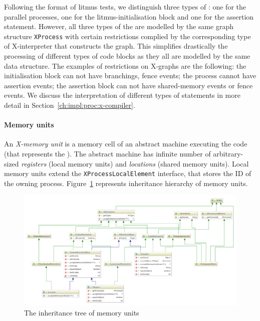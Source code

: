 Following the format of litmus tests, we distinguish three types of \xgraph{}: one for the parallel processes, one for the litmus-initialisation block and one for the assertion statement.
However, all three types of the \xgraph{} are modelled by the same graph structure \texttt{XProcess} with certain restrictions complied by the corresponding type of X-interpreter that constructs the graph.
This simplifies drastically the processing of different types of code blocks as they all are modelled by the same data structure.
The examples of restrictions on X-graphs are the following: the initialisation block can not have branchings, fence events; the process cannot have assertion events; the assertion block can not have shared-memory events or fence events.
We discuss the interpretation of different types of statements in more detail in Section~\ref{ch:impl:proc:x-compiler}.


\paragraph{Memory units}

An \textit{X-memory unit} is a memory cell of an abstract machine executing the code (that represents the \xgraph{}).
The abstract machine has infinite number of arbitrary-sized \textit{registers} (local memory units) and \textit{locations} (shared memory units).
Local memory units extend the \texttt{XProcessLocalElement} interface, that stores the ID of the owning process.
Figure~\ref{fig:class-diagrams:XMemoryUnit} represents inheritance hierarchy of memory units.

\begin{figure}[t]%
  \centering
  \includegraphics[width=\textwidth,height=\textheight,keepaspectratio]{img/my/class-diagrams/XMemoryUnit-m.png}
  \caption{The inheritance tree of \xgraph{} memory units}
  \label{fig:class-diagrams:XMemoryUnit}
\end{figure}

